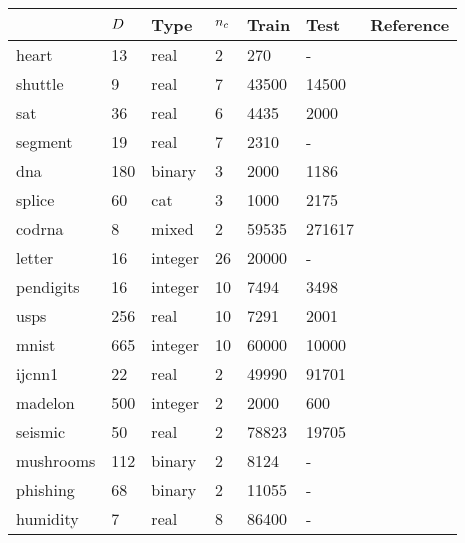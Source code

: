 \begin{tabular}{|l|llllll|}
	\hline
	& $D$ & Type & $n_c$ & Train & Test & Reference \\\hline
	heart & 13 & real & 2 & 270 & - & {\small \citep{Lichman2013}}\\
	shuttle & 9 & real & 7 & 43500 & 14500 & {\small \citep{King_etal1995}}\\
	sat & 36 & real & 6 & 4435 & 2000 & {\small \citep{King_etal1995}}\\
	segment & 19 & real & 7 & 2310 & - & {\small \citep{King_etal1995}} \\
	dna & 180 & binary & 3 & 2000 & 1186 & {\small \citep{Michie_etal1994}}\\
	splice &  60 & cat & 3 & 1000 & 2175 & {\small \citep{Michie_etal1994}}\\
	codrna &  8 & mixed & 2 & 59535 & 271617 & {\small \citep{Uzilov_etal2006}}\\
	letter &  16 & integer & 26 & 20000 & - & {\small \citep{Frey_Slate1991}}\\
	pendigits & 16 & integer & 10 & 7494 & 3498 & {\small \citep{Alimoglu1996}}\\
	usps & 256 & real & 10 & 7291 & 2001 & {\small \citep{Hull1994}}\\
	mnist & 665 & integer & 10 & 60000 & 10000 & {\small \citep{LeCun_etal1998}}\\
	ijcnn1 & 22 & real & 2 & 49990 & 91701 & {\small \citep{Feldkamp_Puskorius1998}}\\
	madelon & 500 & integer & 2 & 2000 & 600 & {\small \citep{Guyon_etal2004}}\\
	seismic & 50 & real & 2 & 78823 & 19705 & {\small \citep{Duarte_Hu2004}}\\
	mushrooms & 112 & binary & 2 & 8124 & - & {\small \citep{Iba_etal1988}}\\
	phishing & 68 & binary & 2 & 11055 & - & {\small \citep{Mohommad_etal2014}}\\
	humidity & 7 & real & 8 & 86400 & - & {\small \citep{Mills2009}}\\
	\hline
\end{tabular}

